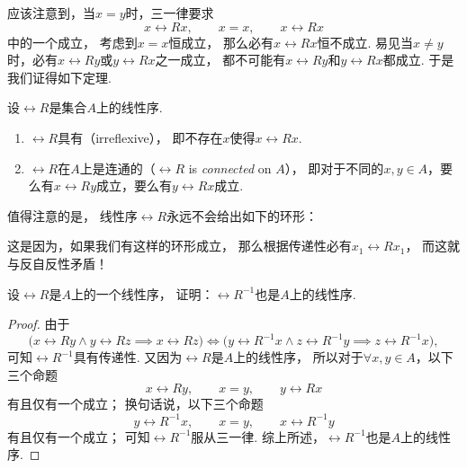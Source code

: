 应该注意到，当\(x = y\)时，三一律要求\[
	x \rel{R} x, \qquad
	x = x, \qquad
	x \rel{R} x
\]中的一个成立，
考虑到\(x = x\)恒成立，
那么必有\(x \rel{R} x\)恒不成立.
易见当\(x \neq y\)时，必有\(x \rel{R} y\)或\(y \rel{R} x\)之一成立，
都不可能有\(x \rel{R} y\)和\(y \rel{R} x\)都成立.
于是我们证得如下定理.

\begin{theorem}
设\(\rel{R}\)是集合\(A\)上的线性序.
\begin{enumerate}
	\item {\rm \(\rel{R}\)具有（irreflexive）}，
	即不存在\(x\)使得\(x \rel{R} x\).

	\item {\rm \(\rel{R}\)在\(A\)上是连通的（\(\rel{R}\) is \emph{connected} on \(A\)）}，
	即对于不同的\(x,y \in A\)，要么有\(x \rel{R} y\)成立，要么有\(y \rel{R} x\)成立.
\end{enumerate}
\end{theorem}

值得注意的是，
线性序\(\rel{R}\)永远不会给出如下的环形：
\begin{center}
\end{center}
这是因为，如果我们有这样的环形成立，
那么根据传递性必有\(x_1 \rel{R} x_1\)，
而这就与反自反性矛盾！

\begin{example}
设\(\rel{R}\)是\(A\)上的一个线性序，
证明：\(\rel{R}^{-1}\)也是\(A\)上的线性序.
\begin{proof}
由于\[
	\bigl( x \rel{R} y \land y \rel{R} z \implies x \rel{R} z \bigr)
	\iff
	\bigl( y \rel{R}^{-1} x \land z \rel{R}^{-1} y \implies z \rel{R}^{-1} x \bigr),
\]
可知\(\rel{R}^{-1}\)具有传递性.
又因为\(\rel{R}\)是\(A\)上的线性序，
所以对于\(\forall x,y \in A\)，以下三个命题\[
	x \rel{R} y, \qquad
	x = y, \qquad
	y \rel{R} x
\]有且仅有一个成立；
换句话说，以下三个命题\[
	y \rel{R}^{-1} x, \qquad
	x = y, \qquad
	x \rel{R}^{-1} y
\]有且仅有一个成立；
可知\(\rel{R}^{-1}\)服从三一律.
综上所述，\(\rel{R}^{-1}\)也是\(A\)上的线性序.
\end{proof}
\end{example}
